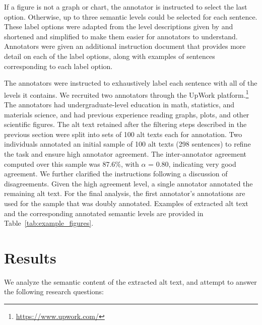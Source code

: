 \documentclass[sigconf]{acmart}
\begin{document}
\noindent If a figure is not a graph or chart, the annotator is instructed to select the last option. Otherwise, up to three semantic levels could be selected for each sentence. These label options were adapted from the level descriptions given by \citet{Lundgard2022AccessibleVV} and shortened and simplified to make them easier for annotators to understand. Annotators were given an additional instruction document that provides more detail on each of the label options, along with examples of sentences corresponding to each label option.


The annotators were instructed to exhaustively label each sentence with all of the levels it contains. We recruited two annotators through the UpWork platform.\footnote{\href{https://www.upwork.com/}{https://www.upwork.com/}} The annotators had undergraduate-level education in math, statistics, and materials science, and had previous experience reading graphs, plots, and other scientific figures. The alt text retained after the filtering steps described in the previous section were split into sets of 100 alt texts each for annotation. Two individuals annotated an initial sample of 100 alt texts (298 sentences) to refine the task and ensure high annotator agreement. The inter-annotator agreement computed over this sample was 87.6\%, with $\alpha$ = 0.80, indicating very good agreement. We further clarified the instructions following a discussion of disagreements. Given the high agreement level, a single annotator annotated the remaining alt text. For the final analysis, the first annotator's annotations are used for the sample that was doubly annotated. Examples of extracted alt text and the corresponding annotated semantic levels are provided in Table~\ref{tab:example_figures}.

\section{Results}
\label{sec:results}

We analyze the semantic content of the extracted alt text, and attempt to answer the following research questions:
\end{document}
